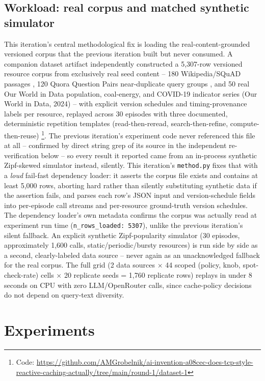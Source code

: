 \documentclass[11pt,letterpaper]{article}
\begin{document}
\subsection{Workload: real corpus and matched synthetic simulator}

This iteration's central methodological fix is loading the real-content-grounded versioned corpus that the
previous iteration built but never consumed. A companion dataset artifact independently constructed a
5,307-row versioned resource corpus from exclusively real seed content -- 180 Wikipedia/SQuAD passages \citep{Rajpurkar2016},
120 Quora Question Pairs near-duplicate query groups \citep{Iyer2017}, and 50 real Our World in Data population,
coal-energy, and COVID-19 indicator series (Our World in Data, 2024) -- with explicit version schedules and timing-provenance
labels per resource, replayed across 30 episodes with three documented, deterministic repetition templates
(read-then-reread, search-then-refine, compute-then-reuse) \footnote{Code: \url{https://github.com/AMGrobelnik/ai-invention-a08cec-does-tcp-style-reactive-caching-actually/tree/main/round-1/dataset-1}}. The previous
iteration's experiment code never referenced this file at all -- confirmed by direct string grep of its
source in the independent re-verification below -- so every result it reported came from an in-process
synthetic Zipf-skewed simulator instead, silently. This iteration's \texttt{method.py} fixes that with a \emph{loud}
fail-fast dependency loader: it asserts the corpus file exists and contains at least 5,000 rows, aborting
hard rather than silently substituting synthetic data if the assertion fails, and parses each row's JSON
input and version-schedule fields into per-episode call streams and per-resource ground-truth version
schedules. The dependency loader's own metadata confirms the corpus was
actually read at experiment run time (\texttt{n\_rows\_loaded: 5307}), unlike the previous iteration's silent
fallback. An explicit synthetic Zipf-popularity simulator (30 episodes, approximately 1,600 calls,
static/periodic/bursty resources) is run side by side as a second, clearly-labeled data source -- never
again as an unacknowledged fallback for the real corpus. The full grid (2 data sources $\times$ 44 scoped
(policy, knob, spot-check-rate) cells $\times$ 20 replicate seeds = 1,760 replicate rows) replays in under 8
seconds on CPU with zero LLM/OpenRouter calls, since cache-policy decisions do not depend on query-text
diversity.

\section{Experiments}
\end{document}

